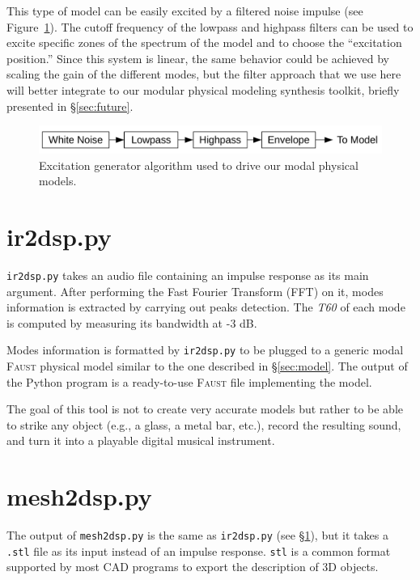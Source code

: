 \documentclass[11pt,a4paper]{article}
\newcommand{\f}{\textsc{Faust}}
\begin{document}
This type of model can be easily excited by a filtered noise impulse (see Figure~\ref{fig:excitation}). The cutoff frequency of the lowpass and highpass filters can be used to excite specific zones of the spectrum of the model and to choose the ``excitation position.'' Since this system is linear, the same behavior could be achieved by scaling the gain of the different modes, but the filter approach that we use here will better integrate to our modular physical modeling synthesis toolkit, briefly presented in \S{}\ref{sec:future}.

\begin{figure}[htbp]
 	\centering \includegraphics[width=\columnwidth]{pictures/excitation}
	\caption{Excitation generator algorithm used to drive our modal physical models.}
	\label{fig:excitation}
\end{figure}

\section{ir2dsp.py}
\label{sec:irdsp}

\texttt{ir2dsp.py} takes an audio file containing an impulse response as its main argument. After performing the Fast Fourier Transform (FFT) on it, modes information is extracted by carrying out peaks detection. The \textit{T60} of each mode is computed by measuring its bandwidth at -3 dB.

Modes information is formatted by \texttt{ir2dsp.py} to be plugged to a generic modal \f{} physical model similar to the one described in \S{}\ref{sec:model}. The output of the Python program is a ready-to-use \f{} file implementing the model.

The goal of this tool is not to create very accurate models but rather to be able to strike any object (e.g., a glass, a metal bar, etc.), record the resulting sound, and turn it into a playable digital musical instrument.

\section{mesh2dsp.py}

The output of \texttt{mesh2dsp.py} is the same as \texttt{ir2dsp.py} (see \S{}\ref{sec:irdsp}), but it takes a \texttt{.stl} file as its input instead of an impulse response. \texttt{stl} is a common format supported by most CAD programs to export the description of 3D objects.
\end{document}
